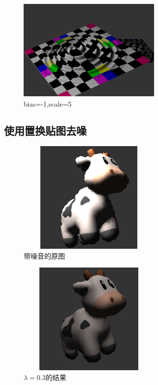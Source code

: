 \documentclass{article}
\begin{document}
  \begin{figure}[H]
	\begin{center}
		
		\includegraphics[width=7cm,height=5cm]{zhihuan -1 5}
		
		\caption{bias=-1,scale=5} \label{zhihuan -1 5.label}
	\end{center}
\end{figure}
	
	\subsection{使用置换贴图去噪}
	
	  \begin{figure}[H]
		\begin{center}
			
			\includegraphics[width=7cm,height=5.5cm]{noise yuantu}
			
			\caption{带噪音的原图} \label{noiseyuan.label}
		\end{center}
	\end{figure}

	  \begin{figure}[H]
	\begin{center}
		
		\includegraphics[width=7cm,height=5.5cm]{noise 0.3}
		
		\caption{$\lambda=0.3$的结果} \label{0.3.label}
	\end{center}
\end{figure}
\end{document}
